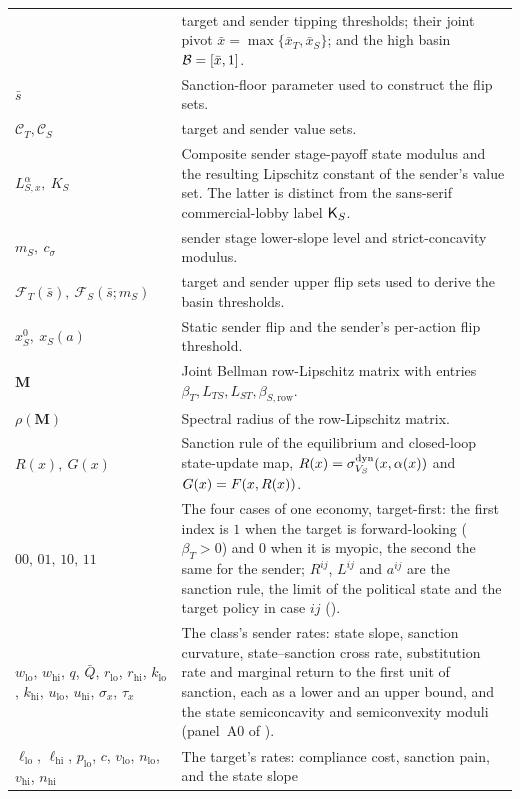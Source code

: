 \begin{longtable}{@{}p{}p{}@{}}
& target and sender tipping thresholds; their joint pivot
$\bar x=\max\{\bar x_T,\bar x_S\}$; and the high basin
$\mathcal{B}=[\bar x,1]$.\\
$\bar s$
& Sanction-floor parameter used to construct the flip sets.\\
$\mathcal C_T,\mathcal C_S$
& target and sender value sets.\\
$L_{S,x}^{\alpha},\ K_S$
& Composite sender stage-payoff state modulus and the resulting Lipschitz
constant of the sender's value set. The latter is distinct from the sans-serif
commercial-lobby label $\mathsf{K}_S$.\\
$m_S,\ c_\sigma$
& sender stage lower-slope level and strict-concavity modulus.\\
$\mathcal F_T(\bar s),\
  \mathcal F_S(\bar s;m_S)$
& target and sender upper flip sets used to derive the basin thresholds.\\
$x_S^0,\ x_S(a)$
& Static sender flip and the sender's per-action flip threshold.\\
$\mathbf M$
& Joint Bellman row-Lipschitz matrix with entries
$\beta_T,L_{TS},L_{ST},\beta_{S,\mathrm{row}}$.\\
$\rho(\mathbf M)$
& Spectral radius of the row-Lipschitz matrix.\\
$R(x),\ G(x)$
& Sanction rule of the equilibrium and closed-loop state-update map,
$R(x)=\sigma^{\mathrm{dyn}}_{V_S}(x,\alpha(x))$ and $G(x)=F(x,R(x))$.\\
$00,\,01,\,10,\,11$
& The four cases of one economy, target-first: the first index is $1$
when the target is forward-looking ($\beta_T>0$) and $0$ when it is myopic, the
second the same for the sender; $R^{ij}$, $L^{ij}$ and $a^{ij}$ are the
sanction rule, the limit of the political state and the target policy in case
$ij$ (\Cref{sec:four-regimes}).\\
$w_{\mathrm{lo}}$, $w_{\mathrm{hi}}$, $q$, $\bar Q$, $r_{\mathrm{lo}}$,
$r_{\mathrm{hi}}$, $k_{\mathrm{lo}}$, $k_{\mathrm{hi}}$, $u_{\mathrm{lo}}$,
$u_{\mathrm{hi}}$, $\sigma_x$, $\tau_x$
& The class's sender rates: state slope, sanction curvature, state--sanction
cross rate, substitution rate and marginal return to the first
unit of sanction, each as a lower and an upper bound, and the state
semiconcavity and semiconvexity moduli (panel~A0 of
\Cref{app:proofs:placable}).\\
$\ell_{\mathrm{lo}}$, $\ell_{\mathrm{hi}}$, $p_{\mathrm{lo}}$, $c$,
$v_{\mathrm{lo}}$, $n_{\mathrm{lo}}$, $v_{\mathrm{hi}}$, $n_{\mathrm{hi}}$
& The target's rates: compliance cost, sanction pain, and the state slope

\end{longtable}
